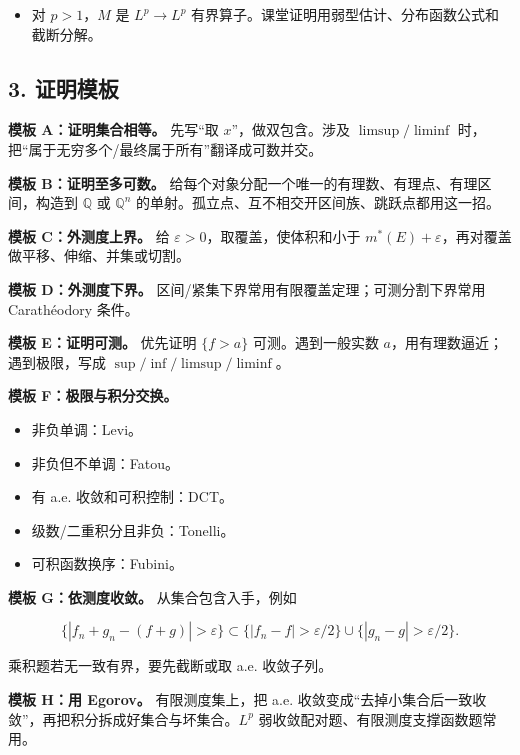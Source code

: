 \documentclass[
UTF8]{ctexart}
\providecommand{\tightlist}{%
\setlength{\itemsep}{0pt}\setlength{\parskip}{0pt}}
\begin{document}
\begin{itemize}
    \tightlist
  \item
    对 \(p>1\)，\(M\) 是 \(L^p\to L^p\)
    有界算子。课堂证明用弱型估计、分布函数公式和截断分解。
\end{itemize}

\subsection{3. 证明模板}\label{ux8bc1ux660eux6a21ux677f}

\textbf{模板 A：证明集合相等。} 先写``取 \(x\)''，做双包含。涉及
\(\limsup/\liminf\) 时，把``属于无穷多个/最终属于所有''翻译成可数并交。

\textbf{模板 B：证明至多可数。}
给每个对象分配一个唯一的有理数、有理点、有理区间，构造到 \(\mathbb Q\)
或 \(\mathbb Q^n\) 的单射。孤立点、互不相交开区间族、跳跃点都用这一招。

\textbf{模板 C：外测度上界。} 给 \(\varepsilon>0\)，取覆盖，使体积和小于
\(m^*(E)+\varepsilon\)，再对覆盖做平移、伸缩、并集或切割。

\textbf{模板 D：外测度下界。}
区间/紧集下界常用有限覆盖定理；可测分割下界常用 Carathéodory 条件。

\textbf{模板 E：证明可测。} 优先证明 \(\{f>a\}\) 可测。遇到一般实数
\(a\)，用有理数逼近；遇到极限，写成 \(\sup/\inf/\limsup/\liminf\)。

\textbf{模板 F：极限与积分交换。}

\begin{itemize}
    \tightlist
  \item
    非负单调：Levi。
  \item
    非负但不单调：Fatou。
  \item
    有 a.e. 收敛和可积控制：DCT。
  \item
    级数/二重积分且非负：Tonelli。
  \item
    可积函数换序：Fubini。
\end{itemize}

\textbf{模板 G：依测度收敛。} 从集合包含入手，例如

\[
  \{|f_n+g_n-(f+g)|>\varepsilon\}
  \subset
  \{|f_n-f|>\varepsilon/2\}\cup\{|g_n-g|>\varepsilon/2\}.
\]

乘积题若无一致有界，要先截断或取 a.e. 收敛子列。

\textbf{模板 H：用 Egorov。} 有限测度集上，把 a.e.
收敛变成``去掉小集合后一致收敛''，再把积分拆成好集合与坏集合。\(L^p\)
弱收敛配对题、有限测度支撑函数题常用。
\end{document}
